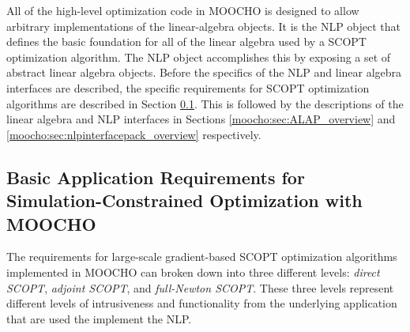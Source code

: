 \documentclass[pdf,12pt,report]{SANDreport}
\begin{document}
All of the high-level optimization code in MOOCHO is designed to allow
arbitrary implementations of the linear-algebra objects.  It is the NLP object
that defines the basic foundation for all of the linear algebra used by a SCOPT
optimization algorithm.  The NLP object accomplishes this by exposing a set of
abstract linear algebra objects.  Before the specifics of the NLP and linear
algebra interfaces are described, the specific requirements for SCOPT
optimization algorithms are described in Section
{}\ref{moocho:sec:nlp_requirements}.  This is followed by the descriptions of
the linear algebra and NLP interfaces in Sections
{}\ref{moocho:sec:ALAP_overview} and
{}\ref{moocho:sec:nlpinterfacepack_overview} respectively.

%
\subsection{Basic Application Requirements for Simulation-Constrained Optimization with MOOCHO}
\label{moocho:sec:nlp_requirements}
% 

The requirements for large-scale gradient-based SCOPT optimization
algorithms implemented in MOOCHO can broken down into three different
levels: \textit{direct SCOPT}, \textit{adjoint SCOPT}, and
{}\textit{full-Newton SCOPT}.  These three levels represent different
levels of intrusiveness and functionality from the underlying
application that are used the implement the NLP.
\end{document}
